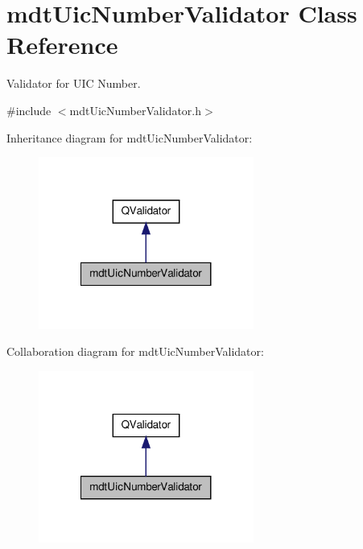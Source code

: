 \hypertarget{classmdt_uic_number_validator}{\section{mdt\-Uic\-Number\-Validator Class Reference}
\label{classmdt_uic_number_validator}
}


Validator for U\-I\-C Number.  




{\ttfamily \#include $<$mdt\-Uic\-Number\-Validator.\-h$>$}



Inheritance diagram for mdt\-Uic\-Number\-Validator\-:
\nopagebreak
\begin{figure}[H]
\begin{center}
\leavevmode
\includegraphics[width=200pt]{classmdt_uic_number_validator__inherit__graph}
\end{center}
\end{figure}


Collaboration diagram for mdt\-Uic\-Number\-Validator\-:
\nopagebreak
\begin{figure}[H]
\begin{center}
\leavevmode
\includegraphics[width=200pt]{classmdt_uic_number_validator__coll__graph}
\end{center}
\end{figure}
